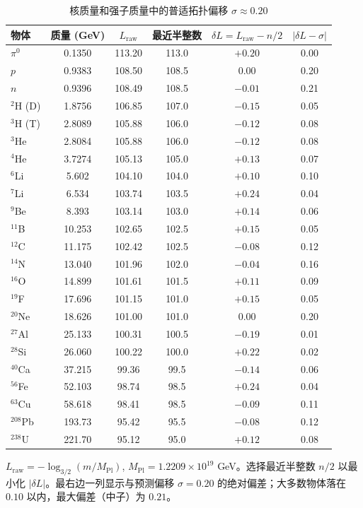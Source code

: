 \documentclass[12pt,a4paper]{article}
\begin{document}
	\begin{table}[htbp]
		\centering
		\caption{核质量和强子质量中的普适拓扑偏移 \(\sigma \approx 0.20\)}
		\label{tab:nuclear_sigma}
		\small
		\begin{tabular}{l c c c c c}
			\toprule
			物体 & 质量 (GeV) & \(L_{\mathrm{raw}}\) & 最近半整数 & \(\delta L = L_{\mathrm{raw}} - n/2\) & \(|\delta L - \sigma|\) \\
			\midrule
			\(\pi^0\) & 0.1350 & 113.20 & 113.0 & \(+0.20\) & 0.00 \\
			\(p\)     & 0.9383 & 108.50 & 108.5 & \(0.00\)  & 0.20 \\
			\(n\)     & 0.9396 & 108.49 & 108.5 & \(-0.01\) & 0.21 \\
			\(^2\)H (D) & 1.8756 & 106.85 & 107.0 & \(-0.15\) & 0.05 \\
			\(^3\)H (T) & 2.8089 & 105.88 & 106.0 & \(-0.12\) & 0.08 \\
			\(^3\)He & 2.8084 & 105.88 & 106.0 & \(-0.12\) & 0.08 \\
			\(^4\)He & 3.7274 & 105.13 & 105.0 & \(+0.13\) & 0.07 \\
			\(^6\)Li & 5.602  & 104.10 & 104.0 & \(+0.10\) & 0.10 \\
			\(^7\)Li & 6.534  & 103.74 & 103.5 & \(+0.24\) & 0.04 \\
			\(^9\)Be & 8.393  & 103.14 & 103.0 & \(+0.14\) & 0.06 \\
			\(^{11}\)B & 10.253 & 102.65 & 102.5 & \(+0.15\) & 0.05 \\
			\(^{12}\)C & 11.175 & 102.42 & 102.5 & \(-0.08\) & 0.12 \\
			\(^{14}\)N & 13.040 & 101.96 & 102.0 & \(-0.04\) & 0.16 \\
			\(^{16}\)O & 14.899 & 101.61 & 101.5 & \(+0.11\) & 0.09 \\
			\(^{19}\)F & 17.696 & 101.15 & 101.0 & \(+0.15\) & 0.05 \\
			\(^{20}\)Ne & 18.626 & 101.00 & 101.0 & \(0.00\)  & 0.20 \\
			\(^{27}\)Al & 25.133 & 100.31 & 100.5 & \(-0.19\) & 0.01 \\
			\(^{28}\)Si & 26.060 & 100.22 & 100.0 & \(+0.22\) & 0.02 \\
			\(^{40}\)Ca & 37.215 & 99.36  & 99.5  & \(-0.14\) & 0.06 \\
			\(^{56}\)Fe & 52.103 & 98.74  & 98.5  & \(+0.24\) & 0.04 \\
			\(^{63}\)Cu & 58.618 & 98.41  & 98.5  & \(-0.09\) & 0.11 \\
			\(^{208}\)Pb & 193.73 & 95.42  & 95.5  & \(-0.08\) & 0.12 \\
			\(^{238}\)U & 221.70 & 95.12  & 95.0  & \(+0.12\) & 0.08 \\
			\bottomrule
		\end{tabular}
		\par\smallskip
		\footnotesize
		\(L_{\mathrm{raw}} = -\log_{3/2}(m/M_{\mathrm{Pl}})\), \(M_{\mathrm{Pl}} = 1.2209\times10^{19}\) GeV。选择最近半整数 $n/2$ 以最小化 $|\delta L|$。最右边一列显示与预测偏移 $\sigma = 0.20$ 的绝对偏差；大多数物体落在 $0.10$ 以内，最大偏差（中子）为 $0.21$。
	\end{table}
	
\end{document}
